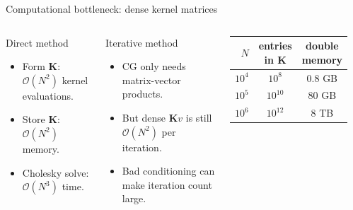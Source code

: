 \documentclass[aspectratio=169,11pt]{ctexbeamer}
\newcommand{\K}{\mathbf{K}}
\newcommand{\OO}{\mathcal{O}}
\begin{document}
\begin{frame}{Computational bottleneck: dense kernel matrices}
\begin{columns}[T,onlytextwidth]
\begin{block}{Direct method}
\begin{itemize}
  \item Form $\K$: $\OO(N^2)$ kernel evaluations.
  \item Store $\K$: $\OO(N^2)$ memory.
  \item Cholesky solve: $\OO(N^3)$ time.
\end{itemize}
\end{block}
\begin{block}{Iterative method}
\begin{itemize}
  \item CG only needs matrix-vector products.
  \item But dense $\K v$ is still $\OO(N^2)$ per iteration.
  \item Bad conditioning can make iteration count large.
\end{itemize}
\end{block}
\begin{center}
\begin{tabular}{rcc}
\toprule
$N$ & entries in $\K$ & double memory \\
\midrule
$10^4$ & $10^8$ & 0.8 GB \\
$10^5$ & $10^{10}$ & 80 GB \\
$10^6$ & $10^{12}$ & 8 TB \\
\bottomrule
\end{tabular}
\end{center}
\vspace{0.35cm}
\begin{center}
\end{center}
\end{columns}
\end{frame}
\end{document}
